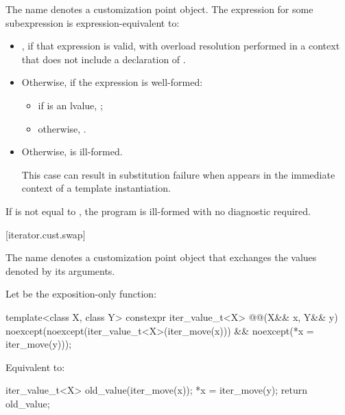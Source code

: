 %
\pnum
The name  denotes
a customization point object.
The expression  for some subexpression  is
expression-equivalent to:

\begin{itemize}
\item {}, if that expression is valid, with overload
resolution performed in a context that does not include a declaration of
.

\item Otherwise, if the expression  is well-formed:
\begin{itemize}
\item if  is an lvalue, ;

\item otherwise, .
\end{itemize}

\item Otherwise,  is ill-formed.
\begin{note}
This case can result in substitution failure when 
appears in the immediate context of a template instantiation.
\end{note}
\end{itemize}

\pnum
If  is not equal to , the program is
ill-formed with no diagnostic required.

[iterator.cust.swap]{}

%
\pnum
The name  denotes
a customization point object
that exchanges the values denoted by its
arguments.

\pnum
Let  be the exposition-only function:
\begin{itemdecl}
template<class X, class Y>
  constexpr iter_value_t<X> @@(X&& x, Y&& y)
    noexcept(noexcept(iter_value_t<X>(iter_move(x))) &&
             noexcept(*x = iter_move(y)));
\end{itemdecl}

\begin{itemdescr}
\pnum
\effects
Equivalent to:
\begin{codeblock}
iter_value_t<X> old_value(iter_move(x));
*x = iter_move(y);
return old_value;
\end{codeblock}
\end{itemdescr}

